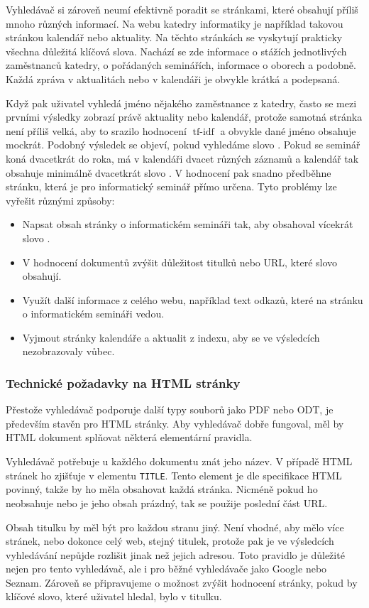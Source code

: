 \documentclass[12pt]{article}
\newcommand{\code}[1]{\texttt{#1}}
\newcommand{\sssection}[1]{\subsubsection{#1}}
\DeclareMathOperator{\tfidf}{tf-idf}
\begin{document}
Vyhledávač si zároveň neumí efektivně poradit se stránkami, které obsahují příliš mnoho různých informací. Na webu katedry informatiky je například takovou stránkou kalendář nebo aktuality. Na těchto stránkách se vyskytují prakticky všechna důležitá klíčová slova. Nachází se zde informace o stážích jednotlivých zaměstnanců katedry, o pořádaných seminářích, informace o oborech a podobně. Každá zpráva v aktualitách nebo v kalendáři je obvykle krátká a podepsaná. 

Když pak uživatel vyhledá jméno nějakého zaměstnance z katedry, často se mezi prvními výsledky zobrazí právě aktuality nebo kalendář, protože samotná stránka není příliš velká, aby to srazilo hodnocení $\tfidf$ a obvykle dané jméno obsahuje mockrát. Podobný výsledek se objeví, pokud vyhledáme slovo . Pokud se seminář koná dvacetkrát do roka, má v kalendáři dvacet různých záznamů a kalendář tak obsahuje minimálně dvacetkrát slovo . V hodnocení pak snadno předběhne stránku, která je pro informatický seminář přímo určena. Tyto problémy lze vyřešit různými způsoby:

\begin{itemize}
	\item Napsat obsah stránky o informatickém semináři tak, aby obsahoval vícekrát slovo .
	\item V hodnocení dokumentů zvýšit důležitost titulků nebo URL, které slovo  obsahují. 
	\item Využít další informace z celého webu, například text odkazů, které na stránku o informatickém semináři vedou. 
	\item Vyjmout stránky kalendáře a aktualit z indexu, aby se ve výsledcích nezobrazovaly vůbec.
\end{itemize}

\sssection{Technické požadavky na HTML stránky}
Přestože vyhledávač podporuje další typy souborů jako PDF nebo ODT, je především stavěn pro HTML stránky. Aby vyhledávač dobře fungoval, měl by HTML dokument splňovat některá elementární pravidla. 

Vyhledávač potřebuje u každého dokumentu znát jeho název. V případě HTML stránek ho zjišťuje v elementu \code{TITLE}. Tento element je dle specifikace HTML povinný, takže by ho měla obsahovat každá stránka. Nicméně pokud ho neobsahuje nebo je jeho obsah prázdný, tak se použije poslední část URL. 

Obsah titulku by měl být pro každou stranu jiný. Není vhodné, aby mělo více stránek, nebo dokonce celý web, stejný titulek, protože pak je ve výsledcích vyhledávání nepůjde rozlišit jinak než jejich adresou. Toto pravidlo je důležité nejen pro tento vyhledávač, ale i pro běžné vyhledávače jako Google nebo Seznam. Zároveň se připravujeme o možnost zvýšit hodnocení stránky, pokud by klíčové slovo, které uživatel hledal, bylo v titulku. 
\end{document}
